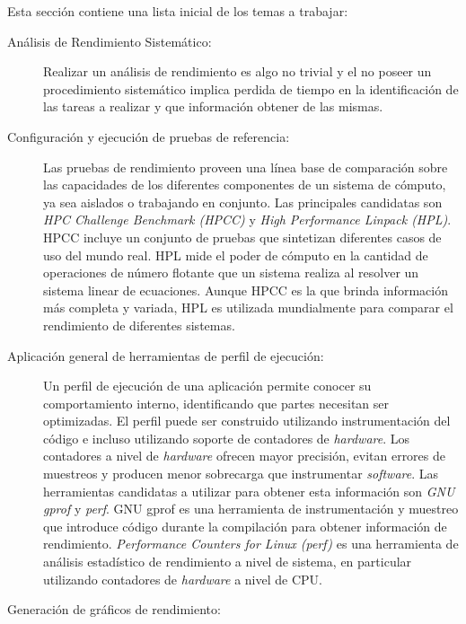 \documentclass[a4paper]{article}
\begin{document}
Esta sección contiene una lista inicial de los temas a trabajar:

\begin{description}

\item[Análisis de Rendimiento Sistemático:]

Realizar un análisis de rendimiento es algo no trivial y el no poseer un procedimiento sistemático implica perdida de tiempo en la identificación de las tareas a realizar y que información obtener de las mismas.

\item[Configuración y ejecución de pruebas de referencia:]

Las pruebas de rendimiento proveen una línea base de comparación sobre las capacidades de los diferentes componentes de un sistema de cómputo, ya sea aislados o trabajando en conjunto. Las principales candidatas son {\it HPC Challenge Benchmark (HPCC)} y {\it High Performance Linpack (HPL)}. HPCC incluye un conjunto de pruebas que sintetizan diferentes casos de uso del mundo real.  HPL mide el poder de cómputo en la cantidad de operaciones de número flotante que un sistema realiza al resolver un sistema linear de ecuaciones. Aunque HPCC es la que brinda información más completa y variada, HPL es utilizada mundialmente para comparar el rendimiento de diferentes sistemas.

\item[Aplicación general de herramientas de perfil de ejecución:]

Un perfil de ejecución de una aplicación permite conocer su comportamiento interno, identificando que partes necesitan ser optimizadas. El perfil puede ser construido utilizando instrumentación del código e incluso utilizando soporte de contadores de {\it hardware}. Los contadores a nivel de {\it hardware} ofrecen mayor precisión, evitan errores de muestreos y producen menor sobrecarga que instrumentar {\it software}.
Las herramientas candidatas a utilizar para obtener esta información son {\it GNU gprof} y {\it perf}. GNU gprof es una herramienta de instrumentación y muestreo que introduce código durante la compilación para obtener información de rendimiento. {\it Performance Counters for Linux (perf)} es una herramienta de análisis estadístico de rendimiento a nivel de sistema, en particular utilizando contadores de {\it hardware} a nivel de CPU.

\item[Generación de gráficos de rendimiento:]


\end{description}
\end{document}
